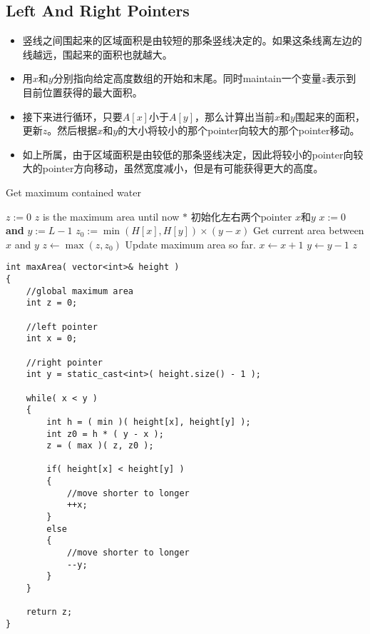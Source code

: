 \subsection{Left And Right Pointers}
\begin{itemize}
	\item 竖线之间围起来的区域面积是由较短的那条竖线决定的。如果这条线离左边的线越远，围起来的面积也就越大。
	\item 用$x$和$y$分别指向给定高度数组的开始和末尾。同时maintain一个变量$z$表示到目前位置获得的最大面积。
	\item 接下来进行循环，只要$A[x]$小于$A[y]$，那么计算出当前$x$和$y$围起来的面积，更新$z$。然后根据$x$和$y$的大小将较小的那个pointer向较大的那个pointer移动。
	\item 如上所属，由于区域面积是由较低的那条竖线决定，因此将较小的pointer向较大的pointer方向移动，虽然宽度减小，但是有可能获得更大的高度。
\end{itemize}
\setcounter{algorithm}{0}
\begin{algorithm}[H]
\caption{Get maximum contained water}
\begin{algorithmic}[1]
\State $z:=0$ \Comment $z$ is the maximum area until now
\State $\ast$ 初始化左右两个pointer $x$和$y$
\State $x:=0$ \textbf{and} $y:=L - 1$
\State $z_0 := \min(H[x], H[y])\times(y-x)$ \Comment Get current area  between $x$ and $y$
\State $z \gets \max(z, z_0)$ \Comment Update maximum area so far.
\State $x \gets x+1$
\Else
\State $y \gets y-1$
\EndIf
\EndWhile
\State \Return $z$
\EndProcedure
\end{algorithmic}
\end{algorithm}
\setcounter{lstlisting}{0}
\begin{lstlisting}[style=customc, caption={Two Pointers}]
int maxArea( vector<int>& height )
{
    //global maximum area
    int z = 0;

    //left pointer
    int x = 0;

    //right pointer
    int y = static_cast<int>( height.size() - 1 );

    while( x < y )
    {
        int h = ( min )( height[x], height[y] );
        int z0 = h * ( y - x );
        z = ( max )( z, z0 );

        if( height[x] < height[y] )
        {
            //move shorter to longer
            ++x;
        }
        else
        {
            //move shorter to longer
            --y;
        }
    }

    return z;
}
\end{lstlisting}